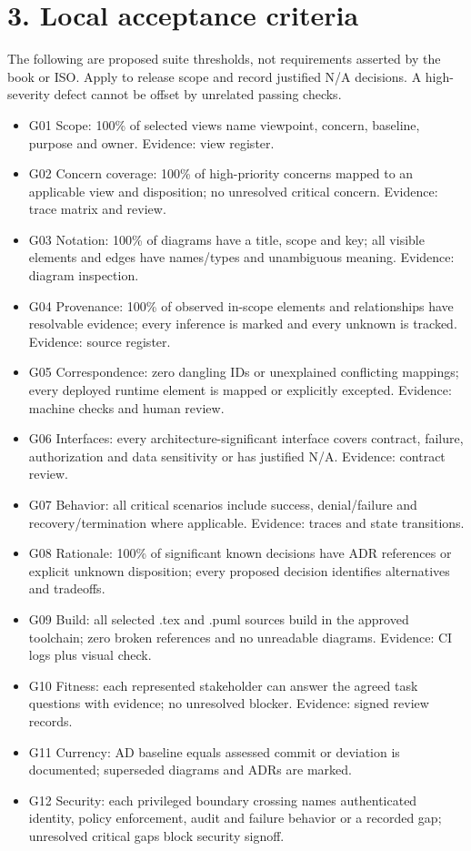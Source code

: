 \documentclass[11pt,letterpaper]{article}
\begin{document}
\section*{3. Local acceptance criteria}
The following are proposed suite thresholds, not requirements asserted by the book or ISO. Apply to release scope and record justified N/A decisions. A high-severity defect cannot be offset by unrelated passing checks.\par\smallskip
\begin{itemize}
\item G01 Scope: 100\% of selected views name viewpoint, concern, baseline, purpose and owner. Evidence: view register.
\item G02 Concern coverage: 100\% of high-priority concerns mapped to an applicable view and disposition; no unresolved critical concern. Evidence: trace matrix and review.
\item G03 Notation: 100\% of diagrams have a title, scope and key; all visible elements and edges have names/types and unambiguous meaning. Evidence: diagram inspection.
\item G04 Provenance: 100\% of observed in-scope elements and relationships have resolvable evidence; every inference is marked and every unknown is tracked. Evidence: source register.
\item G05 Correspondence: zero dangling IDs or unexplained conflicting mappings; every deployed runtime element is mapped or explicitly excepted. Evidence: machine checks and human review.
\item G06 Interfaces: every architecture-significant interface covers contract, failure, authorization and data sensitivity or has justified N/A. Evidence: contract review.
\item G07 Behavior: all critical scenarios include success, denial/failure and recovery/termination where applicable. Evidence: traces and state transitions.
\item G08 Rationale: 100\% of significant known decisions have ADR references or explicit unknown disposition; every proposed decision identifies alternatives and tradeoffs.
\item G09 Build: all selected .tex and .puml sources build in the approved toolchain; zero broken references and no unreadable diagrams. Evidence: CI logs plus visual check.
\item G10 Fitness: each represented stakeholder can answer the agreed task questions with evidence; no unresolved blocker. Evidence: signed review records.
\item G11 Currency: AD baseline equals assessed commit or deviation is documented; superseded diagrams and ADRs are marked.
\item G12 Security: each privileged boundary crossing names authenticated identity, policy enforcement, audit and failure behavior or a recorded gap; unresolved critical gaps block security signoff.
\end{itemize}
\end{document}
